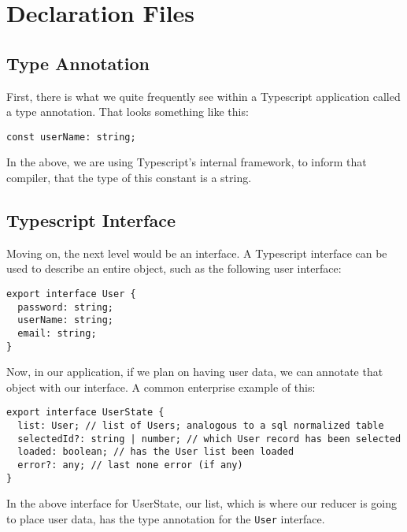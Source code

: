\chapter{Declaration Files}
\section{Type Annotation}
First, there is what we quite frequently see within a Typescript application called a type annotation. That looks something like this: 
\begin{verbatim}
const userName: string;  
\end{verbatim}

In the above, we are using Typescript's internal framework, to inform that compiler, that the type of this constant is a string. 

\section{Typescript Interface}
Moving on, the next level would be an interface. A Typescript interface can be used to describe an entire object, such as the following user interface: 
\begin{lstlisting}[caption=Typescript User Interface]
export interface User {
  password: string;
  userName: string;
  email: string;
}
\end{lstlisting}

Now, in our application, if we plan on having user data, we can annotate that object with our interface. A common enterprise example of this: 
\begin{lstlisting}[caption=user.reducer.ts]
export interface UserState {
  list: User; // list of Users; analogous to a sql normalized table
  selectedId?: string | number; // which User record has been selected
  loaded: boolean; // has the User list been loaded
  error?: any; // last none error (if any)
}  
\end{lstlisting}

In the above interface for UserState, our list, which is where our reducer is going to place user data, has the type annotation for the \lstinline{User} interface.



